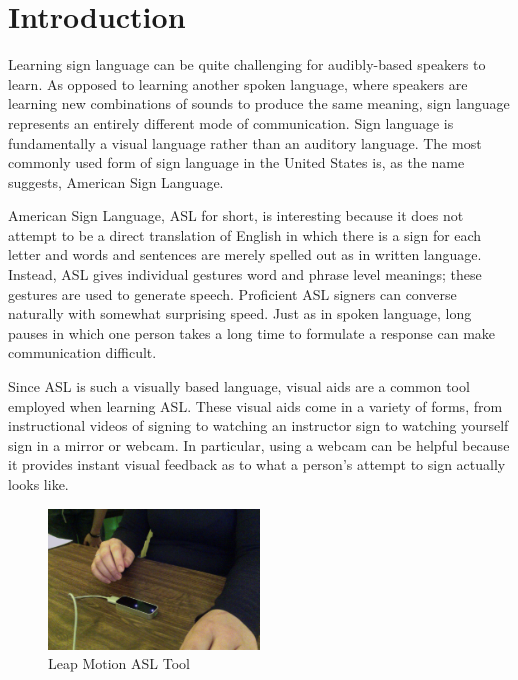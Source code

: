 \documentclass{sigchi}
\begin{document}
\section{Introduction}
Learning sign language can be quite challenging for audibly-based speakers to learn.  As opposed to learning another spoken language, where speakers are learning new combinations of sounds to produce the same meaning, sign language represents an entirely different mode of communication.  Sign language is fundamentally a visual language rather than an auditory language.  The most commonly used form of sign language in the United States is, as the name suggests, American Sign Language. 

American Sign Language, ASL for short, is interesting because it does not attempt to be a direct translation of English in which there is a sign for each letter and words and sentences are merely spelled out as in written language.  Instead, ASL gives individual gestures word and phrase level meanings; these gestures are used to generate speech.  Proficient ASL signers can converse naturally with somewhat surprising speed.  Just as in spoken language, long pauses in which one person takes a long time to formulate a response can make communication difficult.  

Since ASL is such a visually based language, visual aids are a common tool employed when learning ASL.  These visual aids come in a variety of forms, from instructional videos of signing to watching an instructor sign to watching yourself sign in a mirror or webcam.  In particular, using a webcam can be helpful because it provides instant visual feedback as to what a person’s attempt to sign actually looks like. 

\begin{figure}
\centering
\includegraphics[width=0.5\textwidth]{leapUse.jpg}
\caption{Leap Motion ASL Tool}
\label{leapUse}
\end{figure}
\end{document}
